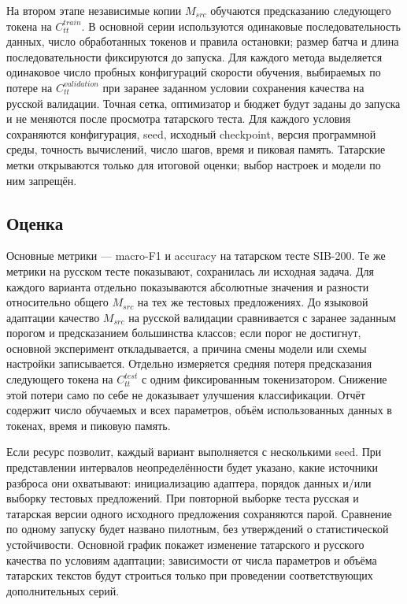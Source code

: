 \documentclass{misisarticle}
\begin{document}
На втором этапе независимые копии $M_{src}$ обучаются предсказанию следующего токена на $C_{tt}^{train}$. В основной серии используются одинаковые последовательность данных, число обработанных токенов и правила остановки; размер батча и длина последовательности фиксируются до запуска. Для каждого метода выделяется одинаковое число пробных конфигураций скорости обучения, выбираемых по потере на $C_{tt}^{validation}$ при заранее заданном условии сохранения качества на русской валидации. Точная сетка, оптимизатор и бюджет будут заданы до запуска и не меняются после просмотра татарского теста. Для каждого условия сохраняются конфигурация, seed, исходный checkpoint, версия программной среды, точность вычислений, число шагов, время и пиковая память. Татарские метки открываются только для итоговой оценки; выбор настроек и модели по ним запрещён.

\subsection{Оценка}

Основные метрики — macro-F1 и accuracy на татарском тесте SIB-200. Те же метрики на русском тесте показывают, сохранилась ли исходная задача. Для каждого варианта отдельно показываются абсолютные значения и разности относительно общего $M_{src}$ на тех же тестовых предложениях. До языковой адаптации качество $M_{src}$ на русской валидации сравнивается с заранее заданным порогом и предсказанием большинства классов; если порог не достигнут, основной эксперимент откладывается, а причина смены модели или схемы настройки записывается. Отдельно измеряется средняя потеря предсказания следующего токена на $C_{tt}^{test}$ с одним фиксированным токенизатором. Снижение этой потери само по себе не доказывает улучшения классификации. Отчёт содержит число обучаемых и всех параметров, объём использованных данных в токенах, время и пиковую память.

Если ресурс позволит, каждый вариант выполняется с несколькими seed. При представлении интервалов неопределённости будет указано, какие источники разброса они охватывают: инициализацию адаптера, порядок данных и/или выборку тестовых предложений. При повторной выборке теста русская и татарская версии одного исходного предложения сохраняются парой. Сравнение по одному запуску будет названо пилотным, без утверждений о статистической устойчивости. Основной график покажет изменение татарского и русского качества по условиям адаптации; зависимости от числа параметров и объёма татарских текстов будут строиться только при проведении соответствующих дополнительных серий.
\end{document}
